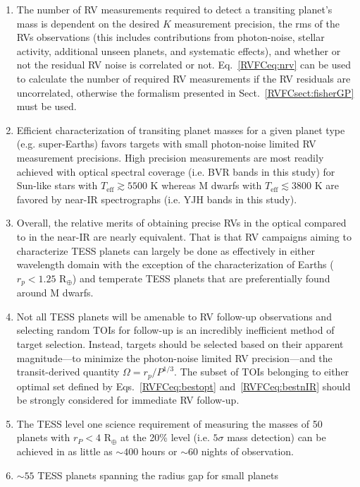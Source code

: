 \begin{enumerate}
\item The number of RV measurements required to detect a transiting planet's mass is dependent on
  the desired $K$ measurement precision, the rms of the RVs observations (this includes contributions
  from photon-noise, stellar activity, additional unseen planets, and systematic effects),
  and whether or not the residual RV noise is correlated or not.
  Eq.~\ref{RVFCeq:nrv} can be used to calculate the number of required RV measurements
  if the RV residuals are uncorrelated,
  otherwise the formalism presented in Sect.~\ref{RVFCsect:fisherGP} must be used.
\item Efficient characterization of transiting planet masses for a given planet type (e.g. super-Earths)
  favors targets with small photon-noise limited RV measurement precisions. High precision measurements
  are most readily achieved with optical spectral coverage (i.e. BVR bands in this study)
  for Sun-like stars with $T_{\text{eff}} \gtrsim 5500$ K whereas  M dwarfs with
  $T_{\text{eff}} \lesssim 3800$ K are favored by near-IR spectrographs (i.e. YJH bands in this study).
\item Overall, the relative merits of obtaining precise RVs in the optical compared to in the near-IR are    
  nearly equivalent. That is that RV campaigns aiming to characterize TESS planets can largely be done as
  effectively in either wavelength domain with the exception of the characterization of Earths 
  ($r_p < 1.25$ R$_{\oplus}$) and temperate TESS planets that are preferentially found around M dwarfs.
\item Not all TESS planets will be amenable to RV follow-up observations and selecting random TOIs
  for follow-up is an incredibly inefficient method of target selection. Instead, targets should be
  selected based on their apparent magnitude---to minimize the photon-noise limited RV precision---and
  the transit-derived quantity $\Omega = r_p / P^{1/3}$. The subset of TOIs belonging to either optimal set defined
  by Eqs.~\ref{RVFCeq:bestopt} and~\ref{RVFCeq:bestnIR} should be strongly considered for immediate RV follow-up.
\item The TESS level one science requirement of measuring the masses of 50 planets with
  $r_P<4$ R$_{\oplus}$ at the 20\% level (i.e. $5\sigma$ mass detection) can be achieved in as little
  as $\sim 400$ hours or $\sim 60$ nights of observation.
\item $\sim 55$ TESS planets spanning the radius gap for small planets

\end{enumerate}
